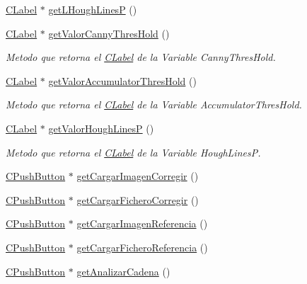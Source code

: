 \begin{DoxyCompactItemize}
\item 
\hyperlink{classCLabel}{C\+Label} $\ast$ \hyperlink{classCPanelOpciones_aa77c510f709f0b022986e5cb6ad16d18}{get\+L\+Hough\+LinesP} ()
\item 
\hyperlink{classCLabel}{C\+Label} $\ast$ \hyperlink{classCPanelOpciones_a65fee0477e988937ea93176f04657388}{get\+Valor\+Canny\+Thres\+Hold} ()
\begin{DoxyCompactList}\small\item\em Metodo que retorna el \hyperlink{classCLabel}{C\+Label} de la Variable Canny\+Thres\+Hold. \end{DoxyCompactList}\item 
\hyperlink{classCLabel}{C\+Label} $\ast$ \hyperlink{classCPanelOpciones_a0f051efb1549353b79966471bc6b656f}{get\+Valor\+Accumulator\+Thres\+Hold} ()
\begin{DoxyCompactList}\small\item\em Metodo que retorna el \hyperlink{classCLabel}{C\+Label} de la Variable Accumulator\+Thres\+Hold. \end{DoxyCompactList}\item 
\hyperlink{classCLabel}{C\+Label} $\ast$ \hyperlink{classCPanelOpciones_aae4983463e8d5e2d07fc93bee488af0b}{get\+Valor\+Hough\+LinesP} ()
\begin{DoxyCompactList}\small\item\em Metodo que retorna el \hyperlink{classCLabel}{C\+Label} de la Variable Hough\+LinesP. \end{DoxyCompactList}\item 
\hyperlink{classCPushButton}{C\+Push\+Button} $\ast$ \hyperlink{classCPanelOpciones_a3babccd178025b47ccc538bfb2827e52}{get\+Cargar\+Imagen\+Corregir} ()
\item 
\hyperlink{classCPushButton}{C\+Push\+Button} $\ast$ \hyperlink{classCPanelOpciones_afa39192d210af9feb190fa434ddd0b39}{get\+Cargar\+Fichero\+Corregir} ()
\item 
\hyperlink{classCPushButton}{C\+Push\+Button} $\ast$ \hyperlink{classCPanelOpciones_a92a9d534e7fede3c8a57cba85ec9879d}{get\+Cargar\+Imagen\+Referencia} ()
\item 
\hyperlink{classCPushButton}{C\+Push\+Button} $\ast$ \hyperlink{classCPanelOpciones_a3d4c1f6f45b5faf9f15cd13f732b4afb}{get\+Cargar\+Fichero\+Referencia} ()
\item 
\hyperlink{classCPushButton}{C\+Push\+Button} $\ast$ \hyperlink{classCPanelOpciones_a096d2b5373b66b8e0db4bd986907ff4c}{get\+Analizar\+Cadena} ()
\item 

\end{DoxyCompactItemize}
